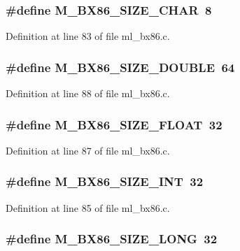 \subsubsection{\setlength{\rightskip}{0pt plus 5cm}\#define M\_\-BX86\_\-SIZE\_\-CHAR~8}\label{ml__bx86_8c_c5f61a596116316673f895d36b233a9b}




Definition at line 83 of file ml\_\-bx86.c.
\subsubsection{\setlength{\rightskip}{0pt plus 5cm}\#define M\_\-BX86\_\-SIZE\_\-DOUBLE~64}\label{ml__bx86_8c_c6f542cc79941edba2a6d9d66cb86ed7}




Definition at line 88 of file ml\_\-bx86.c.
\subsubsection{\setlength{\rightskip}{0pt plus 5cm}\#define M\_\-BX86\_\-SIZE\_\-FLOAT~32}\label{ml__bx86_8c_31be9e8bfde01ea89a309d8fae094a3e}




Definition at line 87 of file ml\_\-bx86.c.
\subsubsection{\setlength{\rightskip}{0pt plus 5cm}\#define M\_\-BX86\_\-SIZE\_\-INT~32}\label{ml__bx86_8c_7f387490d58296626423bf6da353744e}




Definition at line 85 of file ml\_\-bx86.c.
\subsubsection{\setlength{\rightskip}{0pt plus 5cm}\#define M\_\-BX86\_\-SIZE\_\-LONG~32}\label{ml__bx86_8c_ac888d82016d439a2dbd67b4ee126ab2}




